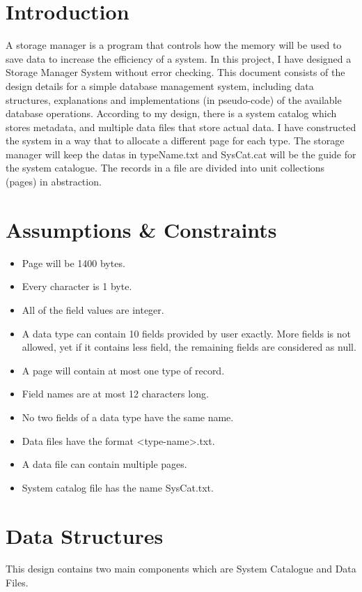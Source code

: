 \documentclass[12pt,a4paper]{article}
\begin{document}
\section{Introduction}
    A storage manager is a program that controls how the memory will be used to save data to increase the efficiency of a system.
    In this project, I have designed a Storage Manager System without error checking. This document consists of the design details for a simple database
    management system, including data structures, explanations and implementations (in pseudo-code) of the available database operations.
    According to my design, there is a system catalog which stores metadata, and multiple data files that store actual data. I have constructed the system in a way that to allocate a different page for each type. The storage manager will keep the datas in typeName.txt and SysCat.cat will be the guide for the system catalogue. The records in a file are divided into unit collections (pages) in abstraction.
\section{Assumptions \& Constraints}
        \begin{itemize}
            \item Page will be 1400 bytes.
            \item Every character is 1 byte.
            \item All of the field values are integer.
            \item A data type can contain 10 fields provided by user exactly. More fields is not allowed, yet if it contains less field, the remaining fields are considered as null.
            \item A page will contain at most one type of record.
            \item Field names are at most 12 characters long.
            \item No two fields of a data type have the same name.
            \item Data files have the format <type-name>.txt.
            \item A data file can contain multiple pages.
            \item System catalog file has the name SysCat.txt.
        \end{itemize}

\section{Data Structures}
    This design contains two main components which are System Catalogue and Data Files.
\end{document}
